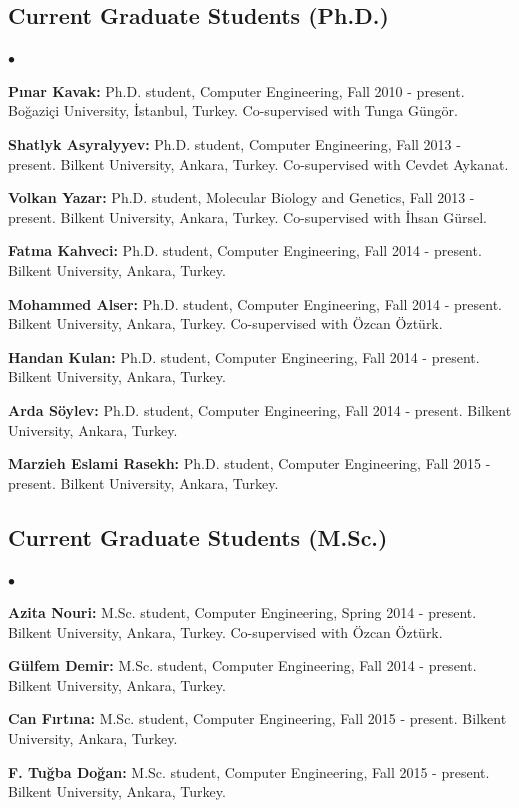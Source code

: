 \documentclass[margin,line]{res}
\newenvironment{list2}{
  \begin{list}{$\bullet$}{%
      \setlength{\itemsep}{0in}
      \setlength{\parsep}{0in} \setlength{\parskip}{0in}
      \setlength{\topsep}{0in} \setlength{\partopsep}{0in} 
      \setlength{\leftmargin}{0.2in}}}{\end{list}}
\begin{document}
\begin{resume}
\subsection{\small \sc Current Graduate Students (Ph.D.)}
\begin{list2}
\item
  {\bf P{\i}nar Kavak:} Ph.D. student, Computer Engineering, Fall 2010 - present.
  Bo\u{g}azi\c{c}i University, \.{I}stanbul, Turkey. Co-supervised with Tunga G\"{u}ng\"{o}r.
\item
  {\bf Shatlyk Asyralyyev:} Ph.D. student, Computer Engineering, Fall 2013 - present.
  Bilkent University, Ankara, Turkey. Co-supervised with Cevdet Aykanat.
\item
  {\bf Volkan Yazar:} Ph.D. student, Molecular Biology and Genetics, Fall 2013 - present.
  Bilkent University, Ankara, Turkey. Co-supervised with İhsan Gürsel.
\item
  {\bf Fatma Kahveci:} Ph.D. student, Computer Engineering, Fall 2014 - present.
  Bilkent University, Ankara, Turkey.
\item
  {\bf Mohammed Alser:} Ph.D. student, Computer Engineering, Fall 2014 - present.
  Bilkent University, Ankara, Turkey. Co-supervised with Özcan Öztürk.
\item
  {\bf Handan Kulan:} Ph.D. student, Computer Engineering, Fall 2014 - present.
  Bilkent University, Ankara, Turkey. 
\item
  {\bf Arda Söylev:} Ph.D. student, Computer Engineering, Fall 2014 - present.
  Bilkent University, Ankara, Turkey. 
\item
  {\bf Marzieh Eslami Rasekh:} Ph.D. student, Computer Engineering, Fall 2015 - present.
  Bilkent University, Ankara, Turkey. 
\end{list2}
\vspace*{-.4cm}
\subsection{\small \sc Current Graduate Students (M.Sc.)}
\begin{list2}
\item
  {\bf Azita Nouri:} M.Sc. student, Computer Engineering, Spring 2014 - present.
  Bilkent University, Ankara, Turkey. Co-supervised with Özcan Öztürk.
\item
  {\bf Gülfem Demir:} M.Sc. student, Computer Engineering, Fall 2014 - present.
  Bilkent University, Ankara, Turkey. 
\item
  {\bf Can Fırtına:} M.Sc. student, Computer Engineering, Fall 2015 - present.
  Bilkent University, Ankara, Turkey. 
\item
  {\bf F. Tuğba Doğan:} M.Sc. student, Computer Engineering, Fall 2015 - present.
  Bilkent University, Ankara, Turkey. 
\end{list2}


\end{resume}
\end{document}
